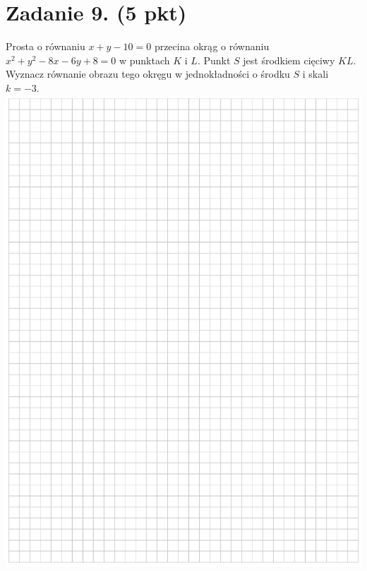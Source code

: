 \documentclass[10pt]{article}
\begin{document}
\section*{Zadanie 9. (5 pkt)}
Prosta o równaniu \(x+y-10=0\) przecina okrąg o równaniu \(x^{2}+y^{2}-8 x-6 y+8=0\) w punktach \(K\) i \(L\). Punkt \(S\) jest środkiem cięciwy \(K L\). Wyznacz równanie obrazu tego okręgu w jednokładności o środku \(S\) i skali \(k=-3\).\\
\includegraphics[max width=\textwidth, center]{2024_11_21_ebf83f11df6f4915f701g-14}\\
\end{document}
